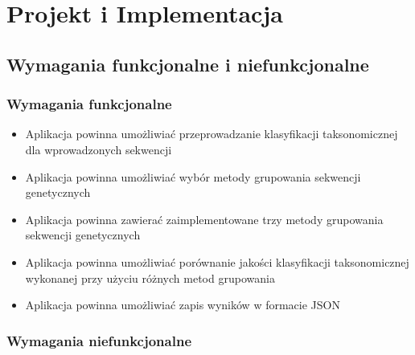 

\clearpage
\section{Projekt i Implementacja}

    \subsection{Wymagania funkcjonalne i niefunkcjonalne}

        \subsubsection{Wymagania funkcjonalne}

            \begin{itemize}
                \item Aplikacja powinna umożliwiać przeprowadzanie klasyfikacji taksonomicznej dla wprowadzonych sekwencji
                \item Aplikacja powinna umożliwiać wybór metody grupowania sekwencji genetycznych
                \item Aplikacja powinna zawierać zaimplementowane trzy metody grupowania sekwencji genetycznych
                \item Aplikacja powinna umożliwiać porównanie jakości klasyfikacji taksonomicznej wykonanej przy użyciu różnych metod grupowania 
                \item Aplikacja powinna umożliwiać zapis wyników w formacie JSON
            \end{itemize}

        \subsubsection{Wymagania niefunkcjonalne}

